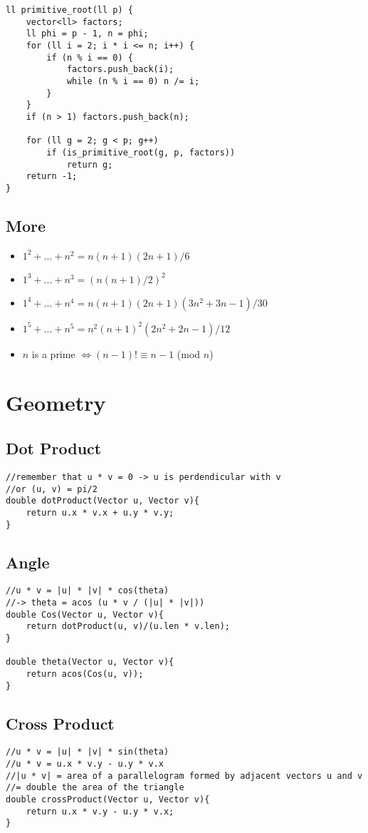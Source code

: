\documentclass[11pt,a4paper]{article}
\begin{document}
\begin{multicols*}{2}
\begin{lstlisting}
ll primitive_root(ll p) {
    vector<ll> factors;
    ll phi = p - 1, n = phi;
    for (ll i = 2; i * i <= n; i++) {
        if (n % i == 0) {
            factors.push_back(i);
            while (n % i == 0) n /= i;
        }
    }
    if (n > 1) factors.push_back(n);

    for (ll g = 2; g < p; g++)
        if (is_primitive_root(g, p, factors))
            return g;
    return -1; 
}
\end{lstlisting}
\subsection{More}
\begin{itemize}
    \item $1^2 + ... + n^2 = n(n + 1)(2n + 1)/6$
    \item $1^3 + ... + n^3 = (n(n + 1)/2)^2$
    \item $1^4 + ... + n^4 = n(n + 1)(2n + 1)(3n^2 + 3n - 1)/30 $
    \item $1^5 + ... + n^5 = n^2(n+1)^2(2n^2+2n-1)/12$
    \item $n$ is a prime $\Leftrightarrow (n - 1)! \equiv n - 1$ (mod $n$)
\end{itemize}


\section{Geometry}
\subsection{Dot Product}
\begin{lstlisting}
//remember that u * v = 0 -> u is perdendicular with v
//or (u, v) = pi/2
double dotProduct(Vector u, Vector v){
    return u.x * v.x + u.y * v.y; 
}
\end{lstlisting}
\subsection{Angle}
\begin{lstlisting}
//u * v = |u| * |v| * cos(theta)
//-> theta = acos (u * v / (|u| * |v|))
double Cos(Vector u, Vector v){
    return dotProduct(u, v)/(u.len * v.len);
}

double theta(Vector u, Vector v){
    return acos(Cos(u, v));
}
\end{lstlisting}

\subsection{Cross Product}
\begin{lstlisting}
//u * v = |u| * |v| * sin(theta)
//u * v = u.x * v.y - u.y * v.x
//|u * v| = area of a parallelogram formed by adjacent vectors u and v 
//= double the area of the triangle 
double crossProduct(Vector u, Vector v){
    return u.x * v.y - u.y * v.x;
}
\end{lstlisting}


\end{multicols*}
\end{document}
